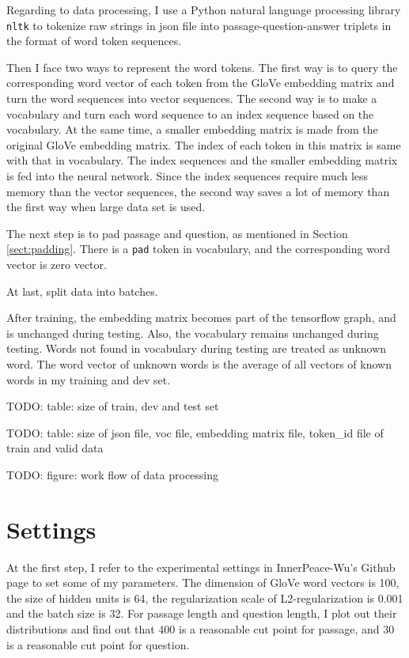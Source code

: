 \documentclass[modernstyle,12pt]{sjsuthesis}
\theoremstyle{definition}
\begin{document}
 Regarding to data processing, I use a Python natural language processing library {\tt nltk} to tokenize raw strings in json file into passage-question-answer triplets in the format of word token sequences.

Then I face two ways to represent the word tokens. The first way is to query the corresponding word vector of each token from the GloVe embedding matrix and turn the word sequences into vector sequences.  The second way is to make a vocabulary and turn each word sequence to an index sequence based on the vocabulary. At the same time, a smaller embedding matrix is made from the original GloVe embedding matrix. The index of each token in this matrix is same with that in vocabulary. The index sequences and the smaller embedding matrix is fed into the neural network. Since the index sequences require much less memory than the vector sequences, the second way saves a lot of memory than the first way when large data set is used.

The next step is to pad passage and question, as mentioned in Section \ref{sect:padding}. There is a {\tt pad} token in vocabulary, and the corresponding word vector is zero vector.

At last, split data into batches.

After training, the embedding matrix becomes part of the tensorflow graph, and is unchanged during testing. Also, the vocabulary remains unchanged during testing. Words not found in vocabulary during testing are treated as unknown word. The word vector of unknown words is the average of all vectors of known words in my training and dev set.

TODO: table: size of train, dev and test set

TODO: table: size of json file, voc file, embedding matrix file, token\_id file of train and valid data

TODO: figure: work flow of data processing

\section{Settings}
At the first step, I refer to the experimental settings in InnerPeace-Wu's Github page to set some of my parameters. The dimension of GloVe word vectors is 100, the size of hidden units is 64, the regularization scale of L2-regularization is 0.001 and the batch size is 32. For passage length and question length, I plot out their distributions and find out that 400 is a reasonable cut point for passage, and 30 is a reasonable cut point for question.
\end{document}
